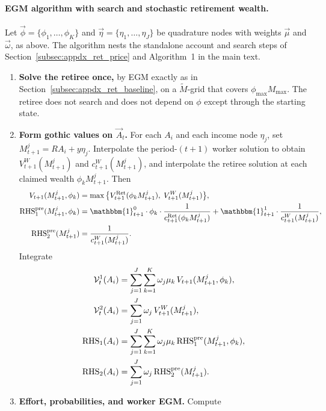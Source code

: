 \paragraph{EGM algorithm with search and stochastic retirement wealth.}
Let $\vec\phi=\{\phi_1,\dots,\phi_{K}\}$ and $\vec\eta=\{\eta_1,\dots,\eta_J\}$ be quadrature nodes with weights $\vec\mu$ and $\vec\omega$, as above. The algorithm nests the standalone account and search steps of Section~\ref{subsec:appdx_ret_price} and Algorithm~1 in the main text.

\begin{enumerate}
	\item \textbf{Solve the retiree once,} by EGM exactly as in Section~\ref{subsec:appdx_ret_baseline}, on a $\tilde M$-grid that covers $\phi_{\max}M_{\max}$. The retiree does not search and does not depend on $\phi$ except through the starting state.
	\item \textbf{Form gothic values on $\vec A_t$.} For each $A_i$ and each income node $\eta_j$, set $M_{t+1}^{j}=R A_i+y\eta_j$. Interpolate the period-$(t+1)$ worker solution to obtain $V_{t+1}^{W}(M_{t+1}^{j})$ and $c_{t+1}^{W}(M_{t+1}^{j})$, and interpolate the retiree solution at each claimed wealth $\phi_k M_{t+1}^{j}$. Then
	\begin{align}
		V_{t+1}(M_{t+1}^{j},\phi_k)
		&= \max\big\{
			V_{t+1}^{\Ret}(\phi_k M_{t+1}^{j}),\;
			V_{t+1}^{W}(M_{t+1}^{j})
		\big\},
		\\
		\mathrm{RHS}_1^{\mathrm{pre}}(M_{t+1}^{j},\phi_k)
		&= \mathbbm{1}_{t+1}^{0}\cdot\phi_k\cdot\frac{1}{c_{t+1}^{\Ret}(\phi_k M_{t+1}^{j})}
		+\mathbbm{1}_{t+1}^{1}\cdot\frac{1}{c_{t+1}^{W}(M_{t+1}^{j})},
		\\
		\mathrm{RHS}_2^{\mathrm{pre}}(M_{t+1}^{j})
		&= \frac{1}{c_{t+1}^{W}(M_{t+1}^{j})}.
	\end{align}
	Integrate
	\begin{align}
		\mathcal{V}_t^{1}(A_i)
		&= \sum_{j=1}^{J}\sum_{k=1}^{K}\omega_j\mu_k\,V_{t+1}(M_{t+1}^{j},\phi_k),
		\\
		\mathcal{V}_t^{2}(A_i)
		&= \sum_{j=1}^{J}\omega_j\,V_{t+1}^{W}(M_{t+1}^{j}),
		\\
		\mathrm{RHS}_1(A_i)
		&= \sum_{j=1}^{J}\sum_{k=1}^{K}\omega_j\mu_k\,\mathrm{RHS}_1^{\mathrm{pre}}(M_{t+1}^{j},\phi_k),
		\\
		\mathrm{RHS}_2(A_i)
		&= \sum_{j=1}^{J}\omega_j\,\mathrm{RHS}_2^{\mathrm{pre}}(M_{t+1}^{j}).
	\end{align}
	\item \textbf{Effort, probabilities, and worker EGM.} Compute

\end{enumerate}
